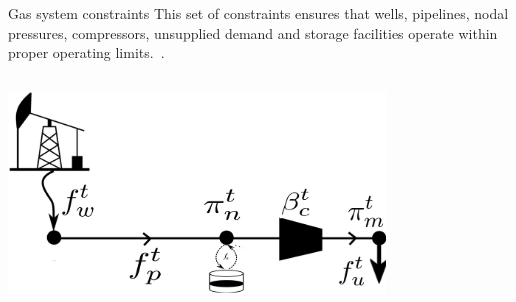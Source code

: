\documentclass[hyperref={colorlinks,citecolor=blue,linkcolor=blue,urlcolor=blue}]{beamer}
\begin{document}
\begin{frame}{Gas system constraints}
\footnotesize
This set of constraints ensures that wells, pipelines, nodal pressures, compressors, unsupplied demand and storage facilities operate within proper operating limits.~\cite{MPNG}.

\begin{columns}
\begin{column}{0.5\textwidth}
    \includegraphics[width=0.75\textwidth]{figures/gas_dummy.png}



\end{column}


\end{columns}
\end{frame}
\end{document}
